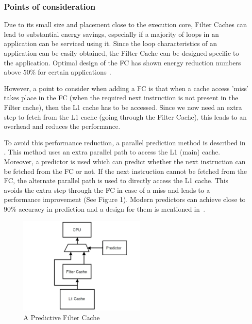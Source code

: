 \documentclass[conference]{IEEEtran}
\begin{document}
	\subsubsection{Points of consideration}
	Due to its small size and placement close to the execution core, Filter Caches can lead to substantial energy savings, especially if a majority of loops in an application can be serviced using it. Since the loop characteristics of an application can be easily obtained, the Filter Cache can be designed specific to the application. Optimal design of the FC has shown energy reduction numbers above 50\% for certain applications~\cite{fc2}.
	
	However, a point to consider when adding a FC is that when a cache access 'miss' takes place in the FC (when the required next instruction is not present in the Filter cache), then the L1 cache has to be accessed. Since we now need an extra step to fetch from the L1 cache (going through the Filter Cache), this leads to an overhead and reduces the performance.
	
	To avoid this performance reduction, a parallel prediction method is described in \cite{fc1}. This method uses an extra parallel path to access the L1 (main) cache. Moreover, a predictor is used which can predict whether the next instruction can be fetched from the FC or not. If the next instruction cannot be fetched from the FC, the alternate parallel path is used to directly access the L1 cache. This avoids the extra step through the FC in case of a miss and leads to a performance improvement (See Figure 1). Modern predictors can achieve close to 90\% accuracy in prediction and a design for them is mentioned in~\cite{fc3}.

\begin{figure}[!h]
	\centering
	\includegraphics[width=2.5in]{images/PredictiveFilterCache.JPG}
	\caption{A Predictive Filter Cache \cite{fc1}}
	\label{Predictive Filter Cache}
\end{figure}
	
\end{document}
